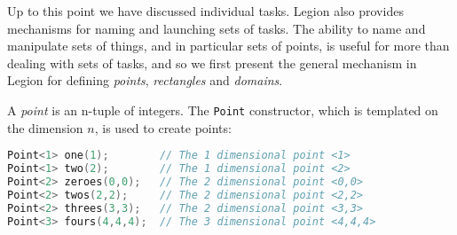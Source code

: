 Up to this point we have discussed individual tasks.  Legion also provides mechanisms for
naming and launching sets of tasks.  The ability to name and manipulate sets of things, and 
in particular sets of points, is useful for
more than dealing with sets of tasks, and so we first present the general mechanism in
Legion for defining {\em points}, {\em rectangles} and {\em domains}.

A {\em point} is an n-tuple of integers.  The {\tt Point} constructor, which is templated on the
dimension $n$,  is used to create points:
\begin{lstlisting}[language=C++,style=inline]
Point<1> one(1);        // The 1 dimensional point <1>
Point<1> two(2);        // The 1 dimensional point <2>
Point<2> zeroes(0,0);   // The 2 dimensional point <0,0>
Point<2> twos(2,2);     // The 2 dimensional point <2,2>
Point<2> threes(3,3);   // The 2 dimensional point <3,3>
Point<3> fours(4,4,4);  // The 3 dimensional point <4,4,4>
\end{lstlisting}

